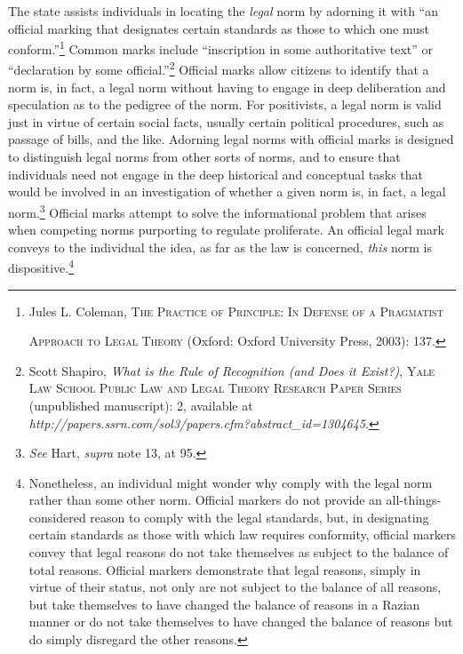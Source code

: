 The state assists individuals in locating the \emph{legal} norm by
adorning it with ``an official marking that designates certain standards
as those to which one must conform.''\footnote{Jules L. Coleman,
  \textsc{The Practice of Principle: In Defense of a Pragmatist}

  \textsc{Approach to Legal Theory} (Oxford: Oxford University Press,
  2003): 137.} Common marks include ``inscription in some authoritative
text'' or ``declaration by some official.''\footnote{Scott Shapiro,
  \emph{What is the Rule of Recognition (and Does it Exist?)},
  \textsc{Yale Law School Public Law and Legal Theory Research Paper
  Series} (unpublished manuscript): 2, available at
  \emph{http://papers.ssrn.com/sol3/papers.cfm?abstract\_id=1304645}.}
Official marks allow citizens to identify that a norm is, in fact, a
legal norm without having to engage in deep deliberation and speculation
as to the pedigree of the norm. For positivists, a legal norm is valid
just in virtue of certain social facts, usually certain political
procedures, such as passage of bills, and the like. Adorning legal norms
with official marks is designed to distinguish legal norms from other
sorts of norms, and to ensure that individuals need not engage in the
deep historical and conceptual tasks that would be involved in an
investigation of whether a given norm is, in fact, a legal
norm.\footnote{\emph{See} Hart, \emph{supra} note 13, at 95.} Official
marks attempt to solve the informational problem that arises when
competing norms purporting to regulate proliferate. An official legal
mark conveys to the individual the idea, as far as the law is concerned,
\emph{this} norm is dispositive.\footnote{Nonetheless, an individual
  might wonder why comply with the legal norm rather than some other
  norm. Official markers do not provide an all-things-considered reason
  to comply with the legal standards, but, in designating certain
  standards as those with which law requires conformity, official
  markers convey that legal reasons do not take themselves as subject to
  the balance of total reasons. Official markers demonstrate that legal
  reasons, simply in virtue of their status, not only are not subject to
  the balance of all reasons, but take themselves to have changed the
  balance of reasons in a Razian manner or do not take themselves to
  have changed the balance of reasons but do simply disregard the other
  reasons.}

